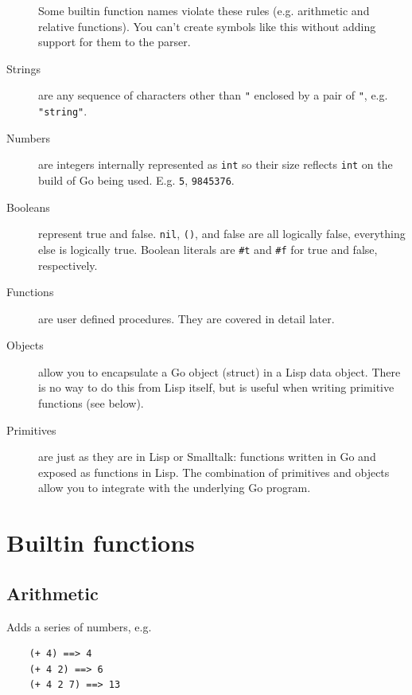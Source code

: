 \documentclass[12pt]{article}
\begin{document}
\begin{description}
Some builtin function names violate these rules (e.g. arithmetic and
relative functions). You can't create symbols like this without
adding support for them to the parser.

\item[Strings] are any sequence of characters other than \verb|"|
enclosed by a pair of \verb|"|, e.g. \verb|"string"|.

\item[Numbers] are integers internally represented as \verb|int| so
  their size reflects \verb|int| on the build of Go being used. E.g.
  \verb|5|, \verb|9845376|. 

\item[Booleans] represent true and false. \verb|nil|, \verb|()|, and
false are all logically false, everything else is logically true.
Boolean literals are \verb|#t| and \verb|#f| for true and false,
respectively. 

\item[Functions] are user defined procedures. They are covered in
detail later.

\item[Objects] allow you to encapsulate a Go object (struct) in a Lisp
  data object. There is no way to do this from Lisp itself, but is
  useful when writing primitive functions (see below). 

\item[Primitives] are just as they are in Lisp or Smalltalk: functions
  written in Go and exposed as functions in Lisp. The combination of
  primitives and objects allow you to integrate with the underlying Go
  program.
\end{description}

\section{Builtin functions}

\subsection{Arithmetic}


Adds a series of numbers, e.g.

\begin{verbatim}
    (+ 4) ==> 4
    (+ 4 2) ==> 6
    (+ 4 2 7) ==> 13
\end{verbatim}

\end{document}
